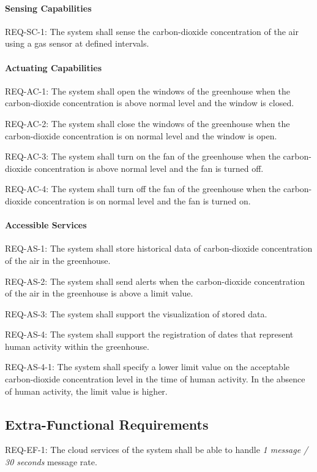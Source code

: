 \documentclass[a4paper, 11pt]{article}
\begin{document}
	\paragraph{Sensing Capabilities}
	REQ-SC-1: The system shall sense the carbon-dioxide concentration of the air using a gas sensor at defined intervals.
	
	\paragraph{Actuating Capabilities}
	REQ-AC-1: The system shall open the windows of the greenhouse when the carbon-dioxide concentration is above normal level and the window is closed.
	
	REQ-AC-2: The system shall close the windows  of the greenhouse when the carbon-dioxide concentration is on normal level and the window is open.
	
	REQ-AC-3: The system shall turn on the fan of the greenhouse when the carbon-dioxide concentration is above normal level and the fan is turned off. 
	
	REQ-AC-4: The system shall turn off the fan of the greenhouse when the carbon-dioxide concentration is on normal level and the fan is turned on.
	
	\paragraph{Accessible Services}
	
	REQ-AS-1: The system shall store historical data of carbon-dioxide concentration of the air in the greenhouse.
	
	REQ-AS-2: The system shall send alerts when the carbon-dioxide concentration of the air in the greenhouse is above a limit value.
	
	REQ-AS-3: The system shall support the visualization of stored data.
	
	REQ-AS-4: The system shall support the registration of dates that represent human activity within the greenhouse.
	
	REQ-AS-4-1: The system shall specify a lower limit value on the acceptable carbon-dioxide concentration level in the time of human activity. In the absence of human activity, the limit value is higher.
	
	\subsection{Extra-Functional Requirements}
	REQ-EF-1: The cloud services of the system shall be able to handle \textsl{1 message / 30 seconds} message rate. 
	
\end{document}
